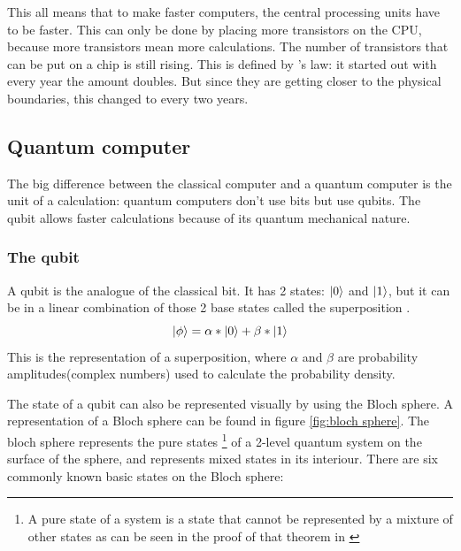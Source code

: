 This all means that to make faster computers, the central processing units have to be faster. This can only be done by placing more transistors on the CPU, because more transistors mean more calculations.
The number of transistors that can be put on a chip is still rising. This is defined by \textcite{Moore1965}'s law: it started out with every year the amount doubles. But since they are getting closer to the physical boundaries, this changed to every two years.


\subsection{Quantum computer} \label{quantum computer}
The big difference between the classical computer and a quantum computer is the unit of a calculation: quantum computers don't use bits but use qubits.
The qubit allows faster calculations because of its quantum mechanical nature.


\subsubsection{The qubit} \label{qubit}
A qubit is the analogue of the classical bit. It has 2 states: $\ket{0}$ and $\ket{1}$, but it can be in a linear combination of those 2 base states called the superposition \autocite{thequbit}.
\begin{equation}
    \ket{\phi} = \alpha * \ket{0} + \beta * \ket{1}
\end{equation}
This is the representation of a superposition, where $\alpha$ and $\beta$ are probability amplitudes(complex numbers) used to calculate the probability density.


The state of a qubit can also be represented visually by using the Bloch sphere. A representation of a Bloch sphere can be found in figure \ref{fig:bloch sphere}. The bloch sphere represents the pure states \footnote{A pure state of a system is a state that cannot be represented by a mixture of other states as can be seen in the proof of that theorem in \textcite{Ballentine2014}} of a 2-level quantum system on the surface of the sphere, and represents mixed states in its interiour.
There are six commonly known basic states on the Bloch sphere:

